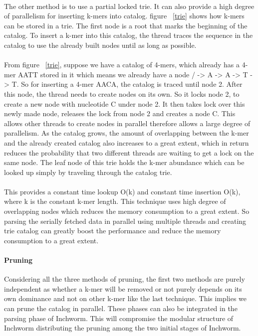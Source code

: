 \label{key}\documentclass[bachinf, english ,zihtitle,final,hyperref,utf8]{zihpub}
\begin{document}
\paragraph{}
The other method is to use a partial locked trie. It can also provide a high degree of parallelism for inserting k-mers into catalog. figure ~\ref{trie} shows how k-mers can be stored in a trie. The first node is a root that marks the beginning of the catalog. To insert a k-mer into this catalog, the thread traces the sequence in the catalog to use the already built nodes until as long as possible. 
\paragraph{}
From figure ~\ref{trie}, suppose we have a catalog of 4-mers, which already has a 4-mer AATT stored in it which means we already have a node / -> A -> A -> T -> T. So for inserting a 4-mer AACA, the catalog is traced until node 2. After this node, the thread needs to create nodes on its own. So it locks node 2, to create a new node with nucleotide C under node 2. It then takes lock over this newly made node, releases the lock from node 2 and creates a node C. This allows other threads to create nodes in parallel therefore allows a large degree of parallelism. As the catalog grows, the amount of overlapping between the k-mer and the already created catalog also increases to a great extent, which in return reduces the probability that two different threads are waiting to get a lock on the same node. The leaf node of this trie holds the k-mer abundance which can be looked up simply by traveling through the catalog trie.
\paragraph{}
This provides a constant time lookup O(k) and constant time insertion O(k), where k is the constant k-mer length. This technique uses high degree of overlapping nodes which reduces the memory consumption to a great extent. So parsing the serially fetched data in parallel using multiple threads and creating trie catalog can greatly boost the performance and reduce the memory consumption to a great extent.
\paragraph{Pruning}
Considering all the three methods of pruning, the first two methods are purely independent as whether a k-mer will be removed or not purely depends on its own dominance and not on other k-mer like the last technique. This implies we can prune the catalog in parallel. These phases can also be integrated in the parsing phase of Inchworm. This will compromise the modular structure of Inchworm distributing the pruning among the two initial stages of Inchworm.
\end{document}
